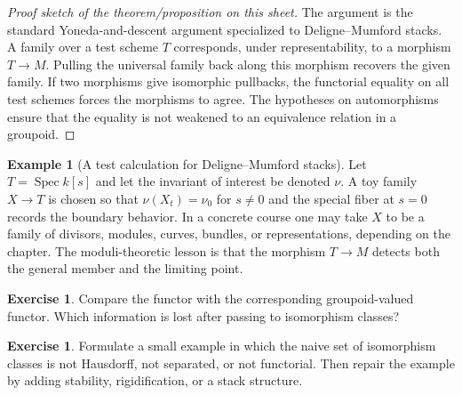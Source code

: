 \documentclass[11pt]{amsart}
\theoremstyle{definition}
\newtheorem{example}[theorem]{Example}
\newtheorem{exercise}[theorem]{Exercise}
\newcommand{\Spec}{\operatorname{Spec}}
\begin{document}
\begin{proof}[Proof sketch of the theorem/proposition on this sheet]
The argument is the standard Yoneda-and-descent argument specialized to Deligne--Mumford stacks.  A family over a test scheme $T$ corresponds, under representability, to a morphism $T\to M$.  Pulling the universal family back along this morphism recovers the given family.  If two morphisms give isomorphic pullbacks, the functorial equality on all test schemes forces the morphisms to agree.  The hypotheses on automorphisms ensure that the equality is not weakened to an equivalence relation in a groupoid.
\end{proof}
\begin{example}[A test calculation for Deligne--Mumford stacks]
Let $T=\Spec k[s]$ and let the invariant of interest be denoted $\nu$.  A toy family $X\to T$ is chosen so that $\nu(X_t)=\nu_0$ for $s\ne0$ and the special fiber at $s=0$ records the boundary behavior.  In a concrete course one may take $X$ to be a family of divisors, modules, curves, bundles, or representations, depending on the chapter.  The moduli-theoretic lesson is that the morphism $T\to M$ detects both the general member and the limiting point.
\end{example}
\begin{exercise}
Compare the functor with the corresponding groupoid-valued functor.  Which information is lost after passing to isomorphism classes?
\end{exercise}
\begin{exercise}
Formulate a small example in which the naive set of isomorphism classes is not Hausdorff, not separated, or not functorial.  Then repair the example by adding stability, rigidification, or a stack structure.
\end{exercise}
\clearpage
\end{document}
